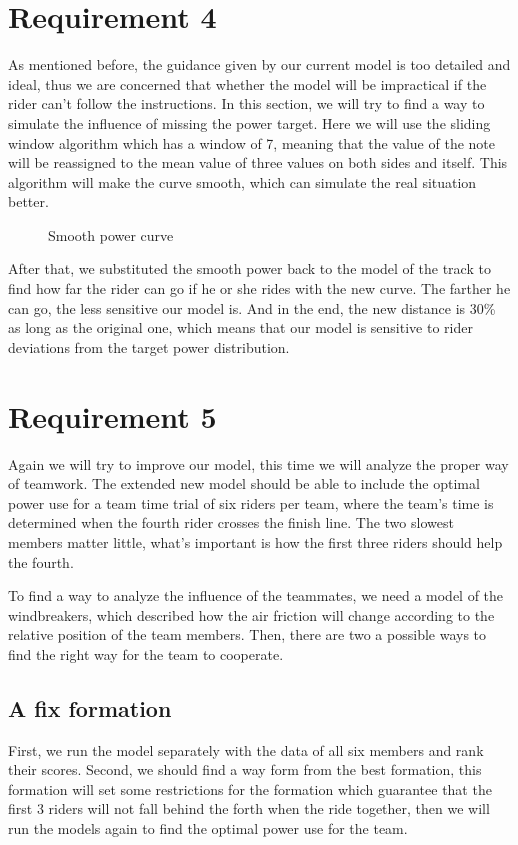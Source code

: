 \documentclass[12pt]{article}
\begin{document}
\section{Requirement 4}
As mentioned before, the guidance given by our current model is too detailed and ideal, thus we are concerned that whether the model will be impractical if the rider can't
follow the instructions. In this section, we will try to find a way to simulate the influence of missing the power target. Here we will use the sliding window algorithm which
has a window of 7, meaning that the value of the note will be reassigned to the mean value of three values on both sides and itself. This algorithm will make the curve smooth,
which can simulate the real situation better.
\begin{figure}
    \centering
    
    \caption{Smooth power curve}
\end{figure}

After that, we substituted the smooth power back to the model of the track to find how far the rider can go if he or she rides with the new curve. The farther he can go, the 
less sensitive our model is. And in the end, the new distance is 30\% as long as the original one, which means that our model is sensitive to rider deviations from the target power
distribution.
\section{Requirement 5}
Again we will try to improve our model, this time we will analyze the proper way of teamwork. The extended new model should be able to include the optimal power use for a team time trial of six riders per team, where the team's time is
determined when the fourth rider crosses the finish line. The two slowest members matter little, what's important is how the first three riders should help the fourth.

To find a way to analyze the influence of the teammates, we need a model of the windbreakers, which described how the air friction will change according to the relative
position of the team members. Then, there are two a possible ways to find the right way for the team to cooperate.
\subsection{A fix formation}
First, we run the model separately with the data of all six members and rank their scores. Second, we should find a way form from the best formation, this formation will
 set some restrictions for the formation which guarantee that the first 3 riders will not fall behind the forth when the ride together, then we will run the models again to 
 find the optimal power use for the team.
\end{document}
